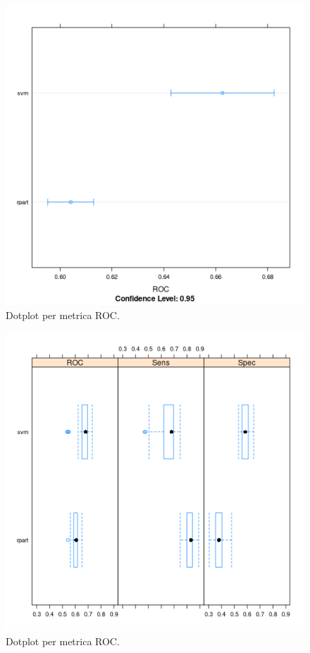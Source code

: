 \begin{figure}[H]
	\centering
	\includegraphics[width=13cm]{../images/compare_dot_plot_fix.png}
	\caption{Dotplot per metrica ROC.}
	\label{fig:compare_dot_plot}
\end{figure}

\begin{figure}[H]
	\centering
	\includegraphics[width=13cm]{../images/compare_bw_plot_fix.png}
	\caption{Dotplot per metrica ROC.}
	\label{fig:compare_bw_plot}
\end{figure}

